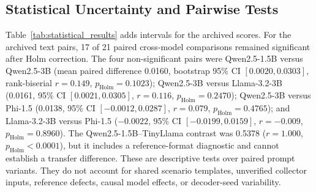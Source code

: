 \documentclass[electronics,article,submit,pdftex,moreauthors]{Definitions/mdpi}
\begin{document}
\begin{table}[ht]
\centering
\caption{Victim-response EOS completeness in the 512-token-budget campaign ($N=300$ per model). All available heuristic segments are reconstructed with 80-token T5 input and output limits and scored against full stored responses. EOS-only metrics select \texttt{response\_complete} samples; they do not certify complete reconstructions. Phi-3.5-mini and TinyLlama remain reference-format diagnostics, and collector provenance remains unverified.}
\label{tab:eos_completeness}
\end{table}

\subsection{Statistical Uncertainty and Pairwise Tests}
Table~\ref{tab:statistical_results} adds intervals for the archived scores. For the archived text pairs, 17 of 21 paired cross-model comparisons remained significant after Holm correction. The four non-significant pairs were Qwen2.5-1.5B versus Qwen2.5-3B (mean paired difference 0.0160, bootstrap 95\% CI $[0.0020,0.0303]$, rank-biserial $r=0.149$, $p_{\mathrm{Holm}}=0.1023$); Qwen2.5-3B versus Llama-3.2-3B (0.0161, 95\% CI $[0.0021,0.0305]$, $r=0.116$, $p_{\mathrm{Holm}}=0.2470$); Qwen2.5-3B versus Phi-1.5 (0.0138, 95\% CI $[-0.0012,0.0287]$, $r=0.079$, $p_{\mathrm{Holm}}=0.4765$); and Llama-3.2-3B versus Phi-1.5 ($-0.0022$, 95\% CI $[-0.0199,0.0159]$, $r=-0.009$, $p_{\mathrm{Holm}}=0.8960$). The Qwen2.5-1.5B--TinyLlama contrast was 0.5378 ($r=1.000$, $p_{\mathrm{Holm}}<0.0001$), but it includes a reference-format diagnostic and cannot establish a transfer difference. These are descriptive tests over paired prompt variants. They do not account for shared scenario templates, unverified collector inputs, reference defects, causal model effects, or decoder-seed variability.
\end{document}
